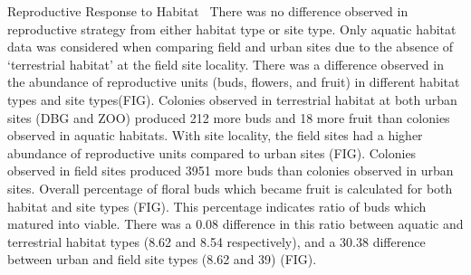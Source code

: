 \documentclass[multicol]{elsarticle}
\begin{document}
\begin{multicols}{2}
\begin{subsection}{Reproductive Response to Habitat}
\,
There was no difference observed in reproductive strategy from either habitat type or site type. Only aquatic habitat data was considered when comparing field and urban sites due to the absence of ‘terrestrial habitat’ at the field site locality. There was a difference observed in the abundance of reproductive units (buds, flowers, and fruit) in different habitat types and site types(FIG). Colonies observed in terrestrial habitat at both urban sites (DBG and ZOO) produced 212 more buds and 18 more fruit than colonies observed in aquatic habitats. With site locality, the field sites had a higher abundance of reproductive units compared to urban sites (FIG). Colonies observed in field sites produced 3951 more buds than colonies observed in urban sites. Overall percentage of floral buds which became fruit is calculated for both habitat and site types (FIG). This percentage indicates ratio of buds which matured into viable. There was a 0.08 difference in this ratio between aquatic and terrestrial habitat types (8.62 and 8.54 respectively), and a 30.38 difference between urban and field site types (8.62 and 39) (FIG).
\end{subsection}
\end{multicols}

\nocite{*}


\end{document}
